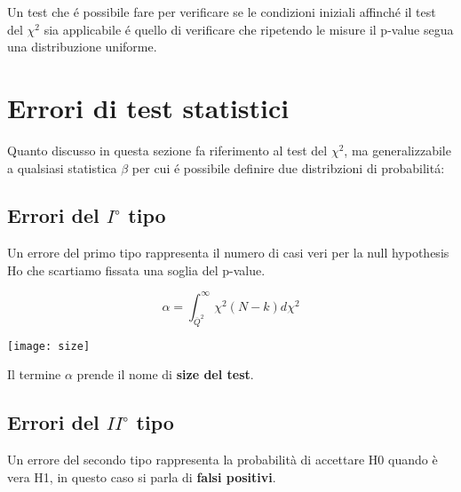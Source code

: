 \noindent Un test che \'{e} possibile fare per verificare se le condizioni iniziali affinch\'{e} il test del $\chi^2$ sia applicabile \'{e} quello di verificare che ripetendo le misure il p-value segua una distribuzione uniforme.
\section{Errori di test statistici}

Quanto discusso in questa sezione fa riferimento al test del $\chi^2$, ma generalizzabile a qualsiasi statistica $\beta$ per cui \'{e} possibile definire due distribzioni di probabilit\'{a}:

\subsection{Errori del $I^{\circ}$ tipo}

Un errore del primo tipo rappresenta il numero di casi veri per la null hypothesis Ho che scartiamo fissata una soglia del p-value.

\vspace{0.3in}
\begin{minipage}{.4\textwidth}
	\begin{equation}
		\alpha = \int_{\overline{Q}^2}^{\infty}\chi^2(N-k)d\chi^2 
	\end{equation}
  \end{minipage}
  \begin{minipage}{.4\textwidth}
    \centering
    \texttt{[image: size]}	
  \end{minipage}
\vspace{0.2in}

Il termine $\alpha $ prende il nome di \textbf{size del test}. 

\subsection{Errori del $II^{\circ}$ tipo}

 Un errore del secondo tipo rappresenta la probabilit\`{a} di accettare H0 quando \`{e} vera H1, in questo caso si parla di \textbf{falsi positivi}. 
 \vspace{0.2in}
 
